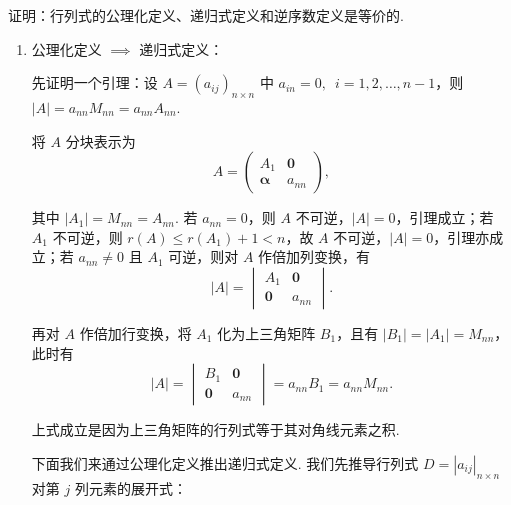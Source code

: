 \begin{exercise}

    \begin{exgroup}
        \item 证明：行列式的公理化定义、递归式定义和逆序数定义是等价的.
        \begin{answer}
            \begin{enumerate}
                \item 公理化定义 $\implies$ 递归式定义：

                    先证明一个引理：设 $A=(a_{ij})_{n \times n}$ 中 $a_{in}=0,\enspace i = 1, 2, \ldots, n-1$，则 $|A| = a_{nn} M_{nn} = a_{nn} A_{nn}$.

                    将 $A$ 分块表示为
                    \[
                        A = \begin{pmatrix}
                            A_1             & \mathbf{0} \\
                            \mathbf{\alpha} & a_{nn}
                        \end{pmatrix},
                    \]

                    其中 $|A_1| = M_{nn} = A_{nn}$. 若 $a_{nn} = 0$，则 $A$ 不可逆，$|A| = 0$，引理成立；若 $A_1$ 不可逆，则 $r(A) \leqslant r(A_1) + 1 < n$，故 $A$ 不可逆，$|A| = 0$，引理亦成立；若 $a_{nn} \neq 0$ 且 $A_1$ 可逆，则对 $A$ 作倍加列变换，有
                    \[
                        |A| = \begin{vmatrix}
                            A_1             & \mathbf{0} \\
                            \mathbf{0}      & a_{nn}
                        \end{vmatrix}.
                    \]

                    再对 $A$ 作倍加行变换，将 $A_1$ 化为上三角矩阵 $B_1$，且有 $|B_1| = |A_1| = M_{nn}$，此时有
                    \[
                        |A| = \begin{vmatrix}
                            B_1             & \mathbf{0} \\
                            \mathbf{0}      & a_{nn}
                        \end{vmatrix} = a_{nn} B_1 = a_{nn} M_{nn}.
                    \]

                    上式成立是因为上三角矩阵的行列式等于其对角线元素之积.

                    下面我们来通过公理化定义推出递归式定义. 我们先推导行列式 $D=|a_{ij}|_{n \times n}$ 对第 $j$ 列元素的展开式：


\end{enumerate}
\end{answer}
\end{exgroup}
\end{exercise}
